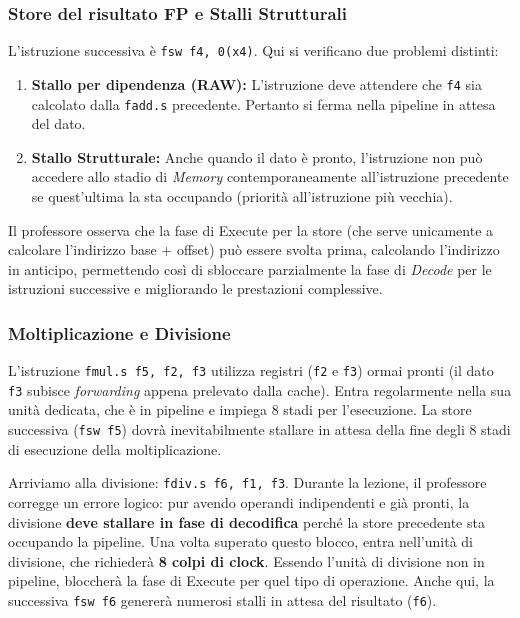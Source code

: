 \subsubsection{Store del risultato FP e Stalli Strutturali}
L'istruzione successiva è \texttt{fsw f4, 0(x4)}. Qui si verificano due problemi distinti:
\begin{enumerate}
    \item \textbf{Stallo per dipendenza (RAW):} L'istruzione deve attendere che \texttt{f4} sia calcolato dalla \texttt{fadd.s} precedente. Pertanto si ferma nella pipeline in attesa del dato.
    \item \textbf{Stallo Strutturale:} Anche quando il dato è pronto, l'istruzione non può accedere allo stadio di \textit{Memory} contemporaneamente all'istruzione precedente se quest'ultima la sta occupando (priorità all'istruzione più vecchia).
\end{enumerate}
Il professore osserva che la fase di Execute per la store (che serve unicamente a calcolare l'indirizzo base + offset) può essere svolta prima, calcolando l'indirizzo in anticipo, permettendo così di sbloccare parzialmente la fase di \textit{Decode} per le istruzioni successive e migliorando le prestazioni complessive.

\subsubsection{Moltiplicazione e Divisione}
L'istruzione \texttt{fmul.s f5, f2, f3} utilizza registri (\texttt{f2} e \texttt{f3}) ormai pronti (il dato \texttt{f3} subisce \textit{forwarding} appena prelevato dalla cache). Entra regolarmente nella sua unità dedicata, che è in pipeline e impiega 8 stadi per l'esecuzione.
La store successiva (\texttt{fsw f5}) dovrà inevitabilmente stallare in attesa della fine degli 8 stadi di esecuzione della moltiplicazione.

Arriviamo alla divisione: \texttt{fdiv.s f6, f1, f3}. Durante la lezione, il professore corregge un errore logico: pur avendo operandi indipendenti e già pronti, la divisione \textbf{deve stallare in fase di decodifica} perché la store precedente sta occupando la pipeline. Una volta superato questo blocco, entra nell'unità di divisione, che richiederà \textbf{8 colpi di clock}. 
Essendo l'unità di divisione non in pipeline, bloccherà la fase di Execute per quel tipo di operazione. Anche qui, la successiva \texttt{fsw f6} genererà numerosi stalli in attesa del risultato (\texttt{f6}).

